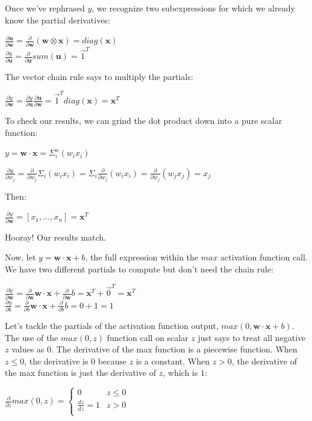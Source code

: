 \documentclass[11pt]{article}
\begin{document}
Once we've rephrased $y$, we recognize two subexpressions for which we already know the partial derivatives:

$\frac{\partial  \mathbf{u}}{\partial \mathbf{w}} = \frac{\partial }{\partial \mathbf{w}} (\mathbf{w} \otimes \mathbf{x}) = diag(\mathbf{x})$\\
$\frac{\partial y}{\partial \mathbf{u}} = \frac{\partial }{\partial \mathbf{u}} sum(\mathbf{u}) = \vec{1}^T$

The vector chain rule says to multiply the partials:

$\frac{\partial y}{\partial \mathbf{w}} = \frac{\partial y}{\partial \mathbf{u}} \frac{\partial \mathbf{u}}{\partial \mathbf{w}} = \vec{1}^T  diag(\mathbf{x}) = \mathbf{x}^T$

To check our results, we can grind the dot product down into a pure scalar function:

$y = \mathbf{w} \cdot \mathbf{x} = \Sigma_i^n (w_i x_i)$

$\frac{\partial y}{\partial w_j} = \frac{\partial}{\partial w_j} \Sigma_i (w_i x_i) = \Sigma_i \frac{\partial}{\partial w_j} (w_i x_i) = \frac{\partial}{\partial w_j} (w_j x_j) = x_j$

Then:

$\frac{\partial y}{\partial \mathbf{w}} = [ x_1, \ldots, x_n ] = \mathbf{x}^T$

Hooray! Our results match. 

Now, let $y = \mathbf{w} \cdot \mathbf{x} + b$, the full expression within the $max$ activation function call. We have two different partials to compute but don't need the chain rule:

$\frac{\partial y}{\partial \mathbf{w}} = \frac{\partial }{\partial \mathbf{w}}\mathbf{w} \cdot \mathbf{x} + \frac{\partial }{\partial \mathbf{w}}b = \mathbf{x}^T + \vec{0}^T = \mathbf{x}^T$\\
$\frac{\partial y}{\partial b} = \frac{\partial }{\partial b}\mathbf{w} \cdot \mathbf{x} + \frac{\partial }{\partial b}b = 0 + 1 = 1$

Let's tackle the partials of the activation function output, $max(0, \mathbf{w} \cdot \mathbf{x} + b)$. The use of the $max(0,z)$ function call on scalar $z$ just says to treat all negative $z$ values as 0.  The derivative of the max function is a piecewise function. When $z \leq 0$, the derivative is 0 because $z$ is a constant. When $z > 0$, the derivative of the max function is just the derivative of $z$, which is $1$:

$
\frac{\partial}{\partial z}max(0,z) =
	\begin{cases}
	0 & z \leq 0\\
	\frac{dz}{dz}=1 & z > 0\\
\end{cases}
$
\end{document}
